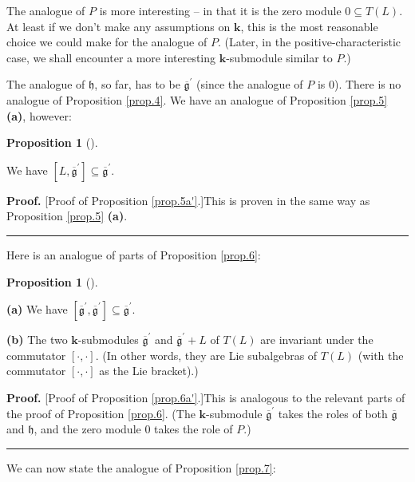 \documentclass[numbers=enddot,12pt,final,onecolumn,notitlepage]{scrartcl}%
\theoremstyle{definition}
\newtheorem{prop}[theo]{Proposition}
\newenvironment{proposition}[1][]
{\begin{prop}[#1]\begin{leftbar}}
{\end{leftbar}\end{prop}}
\newenvironment{proof}[1][Proof]{\noindent\textbf{#1.} }{\ \rule{0.5em}{0.5em}}
\begin{document}
The analogue of $P$ is more interesting -- in that it is the zero module
$0\subseteq T\left(  L\right)  $. At least if we don't make any assumptions on
$\mathbf{k}$, this is the most reasonable choice we could make for the
analogue of $P$. (Later, in the positive-characteristic case, we shall
encounter a more interesting $\mathbf{k}$-submodule similar to $P$.)

The analogue of $\mathfrak{h}$, so far, has to be $\overline{\mathfrak{g}%
}^{\prime}$ (since the analogue of $P$ is $0$). There is no analogue of
Proposition \ref{prop.4}. We have an analogue of Proposition \ref{prop.5}
\textbf{(a)}, however:

\begin{proposition}
\label{prop.5a'}We have $\left[  L,\overline{\mathfrak{g}}^{\prime}\right]
\subseteq\overline{\mathfrak{g}}^{\prime}$.
\end{proposition}

\begin{proof}
[Proof of Proposition \ref{prop.5a'}.]This is proven in the same way as
Proposition \ref{prop.5} \textbf{(a)}.
\end{proof}

Here is an analogue of parts of Proposition \ref{prop.6}:

\begin{proposition}
\label{prop.6a'}\textbf{(a)} We have $\left[  \overline{\mathfrak{g}}^{\prime
},\overline{\mathfrak{g}}^{\prime}\right]  \subseteq\overline{\mathfrak{g}%
}^{\prime}$. \medskip

\textbf{(b)} The two $\mathbf{k}$-submodules $\overline{\mathfrak{g}}^{\prime
}$ and $\overline{\mathfrak{g}}^{\prime}+L$ of $T\left(  L\right)  $ are
invariant under the commutator $\left[  \cdot,\cdot\right]  $. (In other
words, they are Lie subalgebras of $T\left(  L\right)  $ (with the commutator
$\left[  \cdot,\cdot\right]  $ as the Lie bracket).)
\end{proposition}

\begin{proof}
[Proof of Proposition \ref{prop.6a'}.]This is analogous to the relevant parts
of the proof of Proposition \ref{prop.6}. (The $\mathbf{k}$-submodule
$\overline{\mathfrak{g}}^{\prime}$ takes the roles of both $\overline
{\mathfrak{g}}$ and $\mathfrak{h}$, and the zero module $0$ takes the role of
$P$.)
\end{proof}

We can now state the analogue of Proposition \ref{prop.7}:
\end{document}
